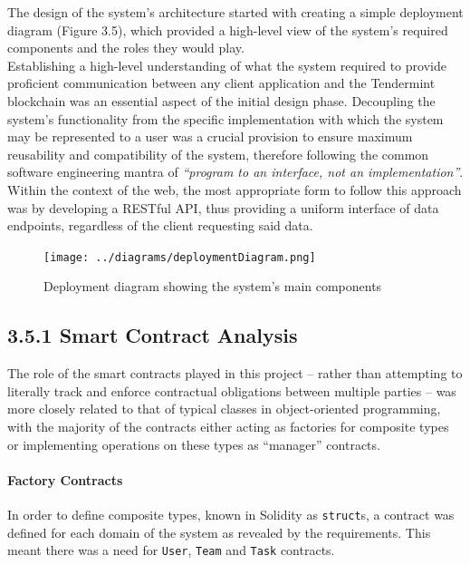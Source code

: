 The design of the system's architecture started with creating a simple
deployment diagram (Figure 3.5), which provided a high-level view of
the system's required components and the roles they would play.\\
Establishing a high-level understanding of what the system required to
provide proficient communication between any client application and the
Tendermint blockchain was an essential aspect of the initial design
phase. Decoupling the system's functionality from the specific
implementation with which the system may be represented to a user was a
crucial provision to ensure maximum reusability and compatibility of the
system, therefore following the common software engineering mantra of
\emph{``program to an interface, not an implementation''}\cite{1programtointerface}.
Within the context of the web, the most appropriate form to follow this
approach was by developing a RESTful\cite{1rest} API, thus providing a
uniform interface of data endpoints, regardless of the client requesting
said data.

\begin{figure}[htbp]
\centering
\texttt{[image: ../diagrams/deploymentDiagram.png]}
\caption{Deployment diagram showing the system's main components}
\end{figure}

\subsection{3.5.1 Smart Contract
Analysis}\label{smart-contract-analysis}

The role of the smart contracts played in this project -- rather than
attempting to literally track and enforce contractual obligations
between multiple parties -- was more closely related to that of typical
classes in object-oriented programming, with the
majority of the contracts either acting as
factories\cite{gamma1995design} for composite types or implementing
operations on these types as ``manager'' contracts.

\paragraph{Factory Contracts}\label{factory-contracts}

In order to define composite types, known in Solidity as
\texttt{struct}s, a contract was defined for each domain of the system
as revealed by the requirements. This meant there was a need for
\texttt{User}, \texttt{Team} and \texttt{Task} contracts.

